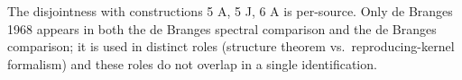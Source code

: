 The disjointness with constructions 5 A, 5 J, 6 A is per-source. Only
de Branges 1968 appears in both the de Branges spectral comparison and the de Branges comparison; it is used in
distinct roles (structure theorem vs.~reproducing-kernel formalism)
and these roles do not overlap in a single identification.
